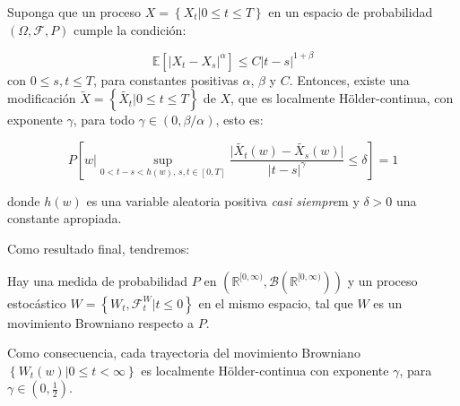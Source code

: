 \begin{theorem}
	Suponga que un proceso $X = \left\{  X_t \vert 0 \leq t \leq T \right\}$ en un espacio de probabilidad $(\Omega, \mathcal{F}, P)$ cumple la condición:

	\[
		\mathbb{E}[ \lvert X_t - X_s \rvert^{\alpha} ] \leq C \lvert t - s \rvert^{ 1 + \beta}
	\]
	con $0 \leq s, t \leq T$, para constantes positivas $\alpha$, $\beta$ y $C$. Entonces, existe una modificación $\tilde{X} = \left\{ \tilde{X_t} \vert  0 \leq t \leq T  \right\}$ de $X$, que es localmente Hölder-continua, con exponente $\gamma$, para todo $\gamma \in (0, \beta / \alpha)$, esto es:

	\[
		P \left[ w \vert \sup_{  0 < t - s < h(w)\text{, } s,t\in [0,T]}  \frac{\lvert  \tilde{X_t}(w) - \tilde{X_s}(w) \rvert }{\lvert t - s \rvert^{\gamma}}  \leq \delta \right] = 1
	\]

	donde $h(w)$ es una variable aleatoria positiva \textit{casi siempre}m y $\delta > 0$ una constante apropiada.

\end{theorem}

Como resultado final, tendremos:

\begin{coro}
	Hay una medida de probabilidad $P$ en $(\mathbb{R}^{ [0, \infty) }, \mathcal{B}(\mathbb{R}^{ [0, \infty) })  )$ y un proceso estocástico $W = \left\{ W_t, \mathcal{F}_t^W \vert t \leq 0 \right\}$ en el mismo espacio, tal que $W$ es un movimiento Browniano respecto a $P$.
\end{coro}

Como consecuencia, cada trayectoria del movimiento Browniano $\left\{ W_t(w) \vert 0 \leq t < \infty \right\}$ es localmente Hölder-continua con exponente $\gamma$, para $\gamma \in \left(0, \frac{1}{2}\right)$.


